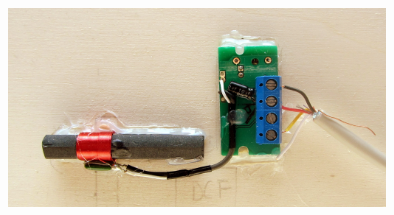 \begin{center}
\includegraphics[width=0.75\textwidth]{images/dcf_empfaenger.jpg}
\label{fig_dcf77}
\end{center}
%
%

